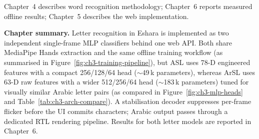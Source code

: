 \noindent Chapter~4 describes word recognition methodology; Chapter~6 reports measured offline results; Chapter~5 describes the web implementation.\par\vspace{0.2cm}

\enlargethispage{2\baselineskip} %

\noindent\textbf{Chapter summary.} Letter recognition in Eshara is implemented as two independent single-frame MLP classifiers behind one web API. Both share MediaPipe Hands extraction and the same offline training workflow (as summarised in Figure~\ref{fig:ch3-training-pipeline}), but ASL uses 78-D engineered features with a compact 256/128/64 head ($\sim$49\,k parameters), whereas ArSL uses 63-D raw features with a wider 512/256/64 head ($\sim$183\,k parameters) tuned for visually similar Arabic letter pairs (as compared in Figure~\ref{fig:ch3-mlp-heads} and Table~\ref{tab:ch3-arch-compare}). A stabilisation decoder suppresses per-frame flicker before the UI commits characters; Arabic output passes through a dedicated RTL rendering pipeline. Results for both letter models are reported in Chapter~6.\par

\clearpage